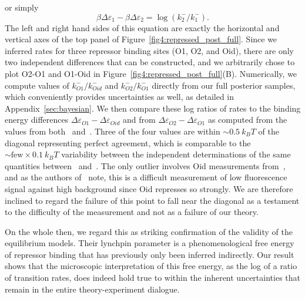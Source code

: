 or simply
\begin{equation}
\beta\Delta\varepsilon_1 - \beta\Delta\varepsilon_2
= \log(k_2^-/k_1^-).
\end{equation}
The left and right hand sides of this equation are exactly the horizontal and
vertical axes of the top panel of Figure~\ref{fig4:repressed_post_full}. Since
we inferred rates for three repressor binding sites (O1, O2, and Oid), there are
only two independent differences that can be constructed, and we arbitrarily
chose to plot O2-O1 and O1-Oid in Figure~\ref{fig4:repressed_post_full}(B).
Numerically, we compute values of $k_{O1}^- / k_{Oid}^-$ and $k_{O2}^- /
k_{O1}^-$ directly from our full posterior samples, which conveniently provides
uncertainties as well, as detailed in Appendix~\ref{sec:bayesian}.
We then compare these log ratios of rates to the
binding energy differences $\Delta\varepsilon_{O1} - \Delta\varepsilon_{Oid}$
and from $\Delta\varepsilon_{O2} - \Delta\varepsilon_{O1}$ as computed from the
values from both~\cite{Garcia2011a} and~\cite{Razo-Mejia2018}. Three of the four
values are within $\sim0.5~k_BT$ of the diagonal representing perfect agreement,
which is comparable to the $\sim\text{few}\times0.1~k_BT$ variability between
the independent determinations of the same quantities between~\cite{Garcia2011a}
and~\cite{Razo-Mejia2018}. The only outlier involves Oid measurements
from~\cite{Razo-Mejia2018}, and as the authors of~\cite{Razo-Mejia2018} note,
this is a difficult measurement of low fluorescence signal against high
background since Oid represses so strongly. We are therefore inclined to regard
the failure of this point to fall near the diagonal as a testament to the
difficulty of the measurement and not as a failure of our theory.

On the whole then, we regard this as striking confirmation of the validity of
the equilibrium models. Their lynchpin parameter is a phenomenological free
energy of repressor binding that has previously only been inferred indirectly.
Our result shows that the microscopic interpretation of this free energy, as the
log of a ratio of transition rates, does indeed hold true to within the inherent
uncertainties that remain in the entire theory-experiment dialogue.

